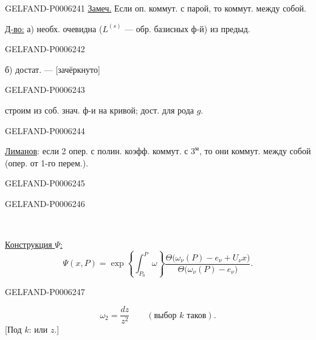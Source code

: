 \begin{GelfandAdjacentEvidence}{GELFAND-P000624}{1}
\underline{Замеч.} Если оп. коммут. с парой, то коммут. между собой.

\underline{Д-во:} а) необх. очевидна (\(L^{(s)}\) --- обр. базисных ф-й) из предыд.
\end{GelfandAdjacentEvidence}
\begin{GelfandAdjacentEvidence}{GELFAND-P000624}{2}


б) достат. --- [зачёркнуто]
\end{GelfandAdjacentEvidence}
\begin{GelfandAdjacentEvidence}{GELFAND-P000624}{3}

строим из соб. знач. ф-и на кривой; дост. для рода \(g\).
\end{GelfandAdjacentEvidence}
\begin{GelfandAdjacentEvidence}{GELFAND-P000624}{4}


\underline{Лиманов}: если 2 опер. с полин. коэфф. коммут. с \(3^{\text{м}}\), то они коммут. между собой (опер. от 1-го перем.).
\end{GelfandAdjacentEvidence}
\begin{GelfandAdjacentEvidence}{GELFAND-P000624}{5}

\end{GelfandAdjacentEvidence}
\begin{GelfandAdjacentEvidence}{GELFAND-P000624}{6}


\begin{center}\textemdash\,\textperiodcentered\,\textemdash\end{center}
\underline{Конструкция \(\Psi\):}
\[
\Psi(x,P)=\exp\left\{\int_{P_0}^{P}\omega\right\}
\frac{\Theta\bigl(\omega_\nu(P)-e_\nu+U_\nu x\bigr)}
{\Theta\bigl(\omega_\nu(P)-e_\nu\bigr)}.
\]
\end{GelfandAdjacentEvidence}
\begin{GelfandAdjacentEvidence}{GELFAND-P000624}{7}

\[
\omega_2=\frac{dz}{z^2}\qquad(\text{выбор \(k\) таков}).
\]
[Под \(k\): или \(z\).]
\end{GelfandAdjacentEvidence}
